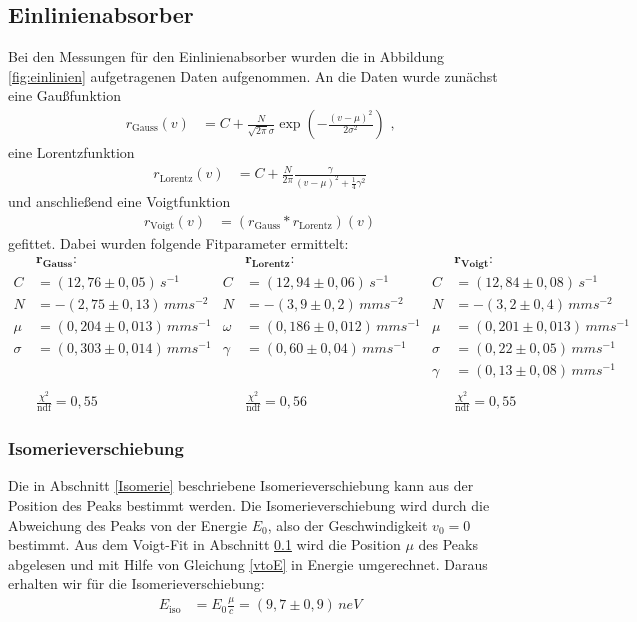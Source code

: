\subsection{Einlinienabsorber}\label{einlinien}
Bei den Messungen für den Einlinienabsorber wurden die in Abbildung \ref{fig:einlinien} aufgetragenen Daten aufgenommen. An die Daten wurde zunächst eine Gaußfunktion
\begin{align}
	r_\mathrm{Gauss}(v)&=C+\frac{N}{\sqrt{2\pi}\sigma}\exp(-\frac{(v-\mu)^2}{2\sigma^2})\text{ ,}
\end{align}
eine Lorentzfunktion 
\begin{align}
	r_\mathrm{Lorentz}(v)&=C+\frac{N}{2\pi}\frac{\gamma}{\left(v-\mu\right)^2+\frac14\gamma^2}
\end{align}
und anschließend eine Voigtfunktion 
\begin{align}
	r_\mathrm{Voigt}(v)&=\left(r_\mathrm{Gauss}*r_\mathrm{Lorentz}\right)(v)
\end{align}
gefittet. Dabei wurden folgende Fitparameter ermittelt:
\begin{align*}
	&\mathbf{r_\textbf{Gauss}}\textbf{:}&&\mathbf{r_\textbf{Lorentz}}\textbf{:}&&\mathbf{r_\textbf{Voigt}}\textbf{:}\\
	C&=(12,76\pm0,05)\,\si{s^{-1}}&C&=(12,94\pm0,06)\,\si{s^{-1}}&C&=(12,84\pm0,08)\,\si{s^{-1}}
	\\N&=-(2,75\pm0,13)\,\si{mms^{-2}}&N&=-(3,9\pm0,2)\,\si{mms^{-2}}&N&=-(3,2\pm0,4)\,\si{mms^{-2}}
	\\\mu&=(0,204\pm0,013)\,\si{mms^{-1}}&\omega&=(0,186\pm0,012)\,\si{mms^{-1}}&\mu&=(0,201\pm0,013)\,\si{mms^{-1}}
	\\\sigma&=(0,303\pm0,014)\,\si{mms^{-1}}&\gamma&=(0,60\pm0,04)\,\si{mms^{-1}}&\sigma&=(0,22\pm0,05)\,\si{mms^{-1}}
	\\&&&&\gamma&=(0,13\pm0,08)\,\si{mms^{-1}}\\\ 
	\\&\frac{\chi^2}{\mathrm{ndf}}=0,55&&\frac{\chi^2}{\mathrm{ndf}}=0,56&&\frac{\chi^2}{\mathrm{ndf}}=0,55
\end{align*}

\subsubsection{Isomerieverschiebung}
Die in Abschnitt \ref{Isomerie} beschriebene Isomerieverschiebung kann aus der Position des Peaks bestimmt werden. Die Isomerieverschiebung wird durch die Abweichung des Peaks von der Energie $E_0$, also der Geschwindigkeit $v_0=0$ bestimmt. Aus dem Voigt-Fit in Abschnitt \ref{einlinien} wird die Position $\mu$ des Peaks abgelesen und mit Hilfe von Gleichung \ref{vtoE} in Energie umgerechnet. Daraus erhalten wir für die Isomerieverschiebung:
\begin{align}
	E_\mathrm{iso}&=E_0\frac{\mu}{c}=(9,7\pm0,9)\,\si{neV}
\end{align}
